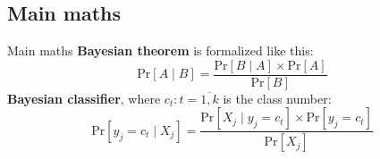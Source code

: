 \documentclass[11pt, aspectratio=169]{beamer}
\newcommand{\emphtext}[1]{\color{black} \textbf{#1}}
\newcommand{\Prob}[1]{\text{Pr}\left[#1\right]}
\begin{document}
    \subsection{Main maths}
    \begin{frame}[allowframebreaks]{Main maths}    	
    	\noindent \emphtext{Bayesian theorem} is formalized like this:
    	\begin{equation}
    		\Prob{A \mid B} = \dfrac{\Prob{B \mid A} \times \Prob{A}}{\Prob{B}}
    	\end{equation}
    	\noindent \emphtext{Bayesian classifier}, where $c_t : t = \overline{1, k}$ is the class number:
    	\begin{equation}
    		\label{eqn:problemprob}
    		\Prob{y_j = c_t \mid X_j} = \dfrac{\Prob{X_j \mid y_j = c_t} \times \Prob{y_j = c_t}}{\Prob{X_j}}
    	\end{equation}
    	

\end{frame}
\end{document}
